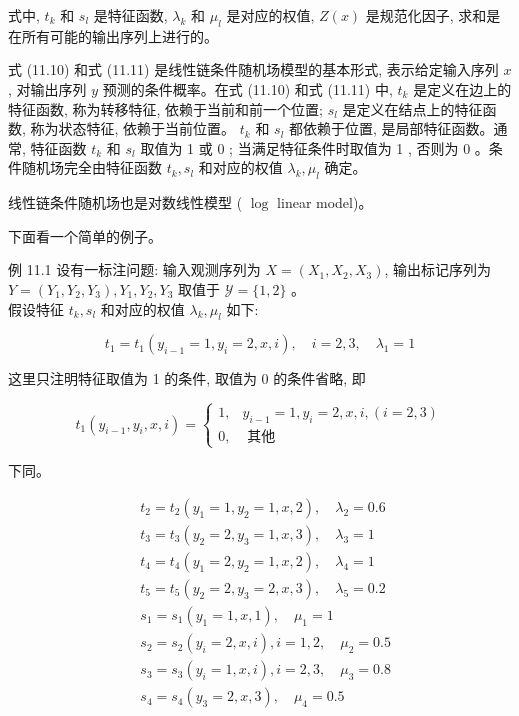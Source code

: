 \documentclass[10pt]{article}
\begin{document}
\begin{CJK*}{UTF8}{bsmi}
式中, $t_{k}$ 和 $s_{l}$ 是特征函数, $\lambda_{k}$ 和 $\mu_{l}$ 是对应的权值, $Z(x)$ 是规范化因子, 求和是在所有可能的输出序列上进行的。

式 (11.10) 和式 (11.11) 是线性链条件随机场模型的基本形式, 表示给定输入序列 $x$, 对输出序列 $y$ 预测的条件概率。在式 (11.10) 和式 (11.11) 中, $t_{k}$ 是定义在边上的特征函数, 称为转移特征, 依赖于当前和前一个位置; $s_{l}$ 是定义在结点上的特征函数, 称为状态特征, 依赖于当前位置。 $t_{k}$ 和 $s_{l}$ 都依赖于位置, 是局部特征函数。通常, 特征函数 $t_{k}$ 和 $s_{l}$ 取值为 1 或 0 ; 当满足特征条件时取值为 1 , 否则为 0 。条件随机场完全由特征函数 $t_{k}, s_{l}$ 和对应的权值 $\lambda_{k}, \mu_{l}$ 确定。

线性链条件随机场也是对数线性模型 ( $\log$ linear model)。

下面看一个简单的例子。

例 11.1 设有一标注问题: 输入观测序列为 $X=\left(X_{1}, X_{2}, X_{3}\right)$, 输出标记序列为 $Y=\left(Y_{1}, Y_{2}, Y_{3}\right), Y_{1}, Y_{2}, Y_{3}$ 取值于 $\mathcal{Y}=\{1,2\}$ 。\\
假设特征 $t_{k}, s_{l}$ 和对应的权值 $\lambda_{k}, \mu_{l}$ 如下:

$$
t_{1}=t_{1}\left(y_{i-1}=1, y_{i}=2, x, i\right), \quad i=2,3, \quad \lambda_{1}=1
$$

这里只注明特征取值为 1 的条件, 取值为 0 的条件省略, 即

$$
t_{1}\left(y_{i-1}, y_{i}, x, i\right)= \begin{cases}1, & y_{i-1}=1, y_{i}=2, x, i,(i=2,3) \\ 0, & \text { 其他 }\end{cases}
$$

下同。

$$
\begin{aligned}
& t_{2}=t_{2}\left(y_{1}=1, y_{2}=1, x, 2\right), \quad \lambda_{2}=0.6 \\
& t_{3}=t_{3}\left(y_{2}=2, y_{3}=1, x, 3\right), \quad \lambda_{3}=1 \\
& t_{4}=t_{4}\left(y_{1}=2, y_{2}=1, x, 2\right), \quad \lambda_{4}=1 \\
& t_{5}=t_{5}\left(y_{2}=2, y_{3}=2, x, 3\right), \quad \lambda_{5}=0.2 \\
& s_{1}=s_{1}\left(y_{1}=1, x, 1\right), \quad \mu_{1}=1 \\
& s_{2}=s_{2}\left(y_{i}=2, x, i\right), i=1,2, \quad \mu_{2}=0.5 \\
& s_{3}=s_{3}\left(y_{i}=1, x, i\right), i=2,3, \quad \mu_{3}=0.8 \\
& s_{4}=s_{4}\left(y_{3}=2, x, 3\right), \quad \mu_{4}=0.5
\end{aligned}
$$


\end{CJK*}
\end{document}
